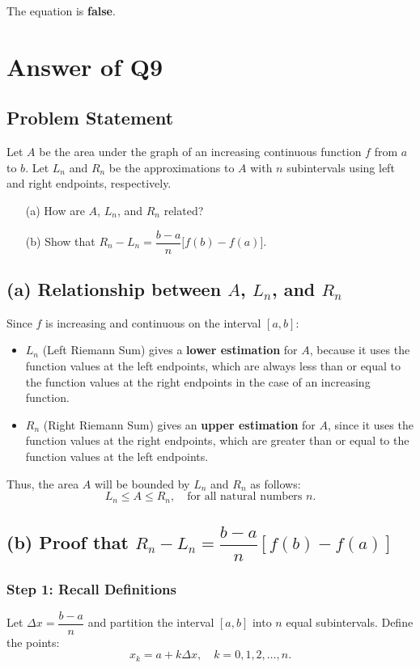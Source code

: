 \documentclass{article}
\begin{document}
The equation is \textbf{false}.
\section*{Answer of Q9}
\subsection*{Problem Statement}
Let $A$ be the area under the graph of an increasing continuous function $f$ from $a$ to $b$. Let $L_n$ and $R_n$ be the approximations to $A$ with $n$ subintervals using left and right endpoints, respectively.

\begin{enumerate}
    \item[(a)] How are $A$, $L_n$, and $R_n$ related?
    \item[(b)] Show that $R_n - L_n = \dfrac{b - a}{n}\bigl[f(b) - f(a)\bigr]$.
\end{enumerate}

\subsection*{(a) Relationship between $A$, $L_n$, and $R_n$}
Since $f$ is increasing and continuous on the interval $[a,b]$:

\begin{itemize}
    \item $L_n$ (Left Riemann Sum) gives a \textbf{lower estimation} for $A$, because it uses the function values at the left endpoints, which are always less than or equal to the function values at the right endpoints in the case of an increasing function.
    \item $R_n$ (Right Riemann Sum) gives an \textbf{upper estimation} for $A$, since it uses the function values at the right endpoints, which are greater than or equal to the function values at the left endpoints.
\end{itemize}

Thus, the area $A$ will be bounded by $L_n$ and $R_n$ as follows:
\[
L_n \leq A \leq R_n, \quad \text{for all natural numbers } n.
\]

\subsection*{(b) Proof that $R_n - L_n = \dfrac{b - a}{n}[f(b) - f(a)]$}

\subsubsection*{Step 1: Recall Definitions}
Let $\Delta x = \dfrac{b - a}{n}$ and partition the interval $[a, b]$ into $n$ equal subintervals. Define the points:
\[
    x_k = a + k\Delta x, \quad k = 0, 1, 2, \ldots, n.
\]
\end{document}
